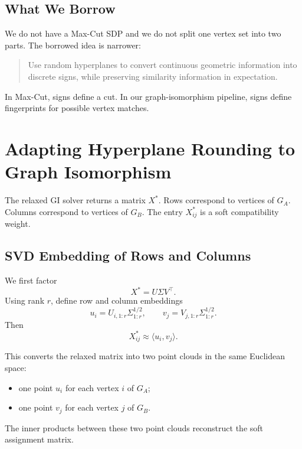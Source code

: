 \documentclass[11pt]{article}
\begin{document}
\subsection{What We Borrow}

We do not have a Max-Cut SDP and we do not split one vertex set into two
parts.
The borrowed idea is narrower:
\begin{quote}
Use random hyperplanes to convert continuous geometric information into
discrete signs, while preserving similarity information in expectation.
\end{quote}

In Max-Cut, signs define a cut.
In our graph-isomorphism pipeline, signs define fingerprints for possible
vertex matches.

\section{Adapting Hyperplane Rounding to Graph Isomorphism}

The relaxed GI solver returns a matrix $X^*$.
Rows correspond to vertices of $G_A$.
Columns correspond to vertices of $G_B$.
The entry $X^*_{ij}$ is a soft compatibility weight.

\subsection{SVD Embedding of Rows and Columns}

We first factor
\begin{equation}
    X^* = U\Sigma V^\top.
\end{equation}
Using rank $r$, define row and column embeddings
\begin{equation}
    u_i = U_{i,1:r}\Sigma_{1:r}^{1/2},
    \qquad
    v_j = V_{j,1:r}\Sigma_{1:r}^{1/2}.
\end{equation}
Then
\begin{equation}
    X^*_{ij}
    \approx
    \langle u_i,v_j\rangle.
\end{equation}

This converts the relaxed matrix into two point clouds in the same Euclidean
space:
\begin{itemize}[leftmargin=*]
    \item one point $u_i$ for each vertex $i$ of $G_A$;
    \item one point $v_j$ for each vertex $j$ of $G_B$.
\end{itemize}
The inner products between these two point clouds reconstruct the soft
assignment matrix.
\end{document}

